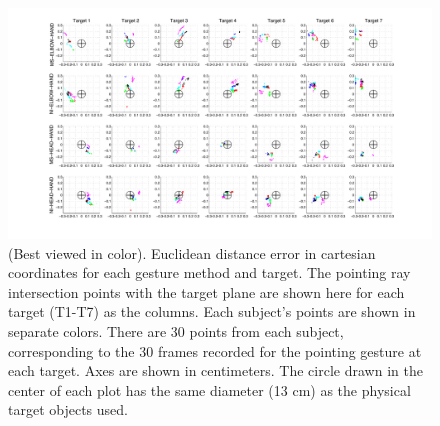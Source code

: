 \begin{landscape}
\begin{figure}[ht!]
\centering
\includegraphics[width=1.5\textwidth]{pics/projections.pdf}
\caption{(Best viewed in color). Euclidean distance error in cartesian coordinates for each gesture method and target. The pointing ray intersection points with the target plane are shown here for each target (T1-T7) as the columns.  Each subject's points are shown in separate colors.  There are 30 points from each subject, corresponding to the 30 frames recorded for the pointing gesture at each target.  Axes are shown in centimeters.  The circle drawn in the center of each plot has the same diameter (13 cm) as the physical target objects used.}
\label{fig:euclidean_projections}
\end{figure}
\end{landscape}

